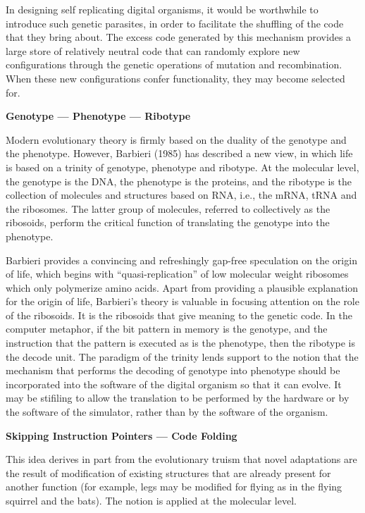 In designing self replicating digital organisms,
it would be worthwhile to introduce such genetic parasites, in order to
facilitate the shuffling of the code that they bring about.  The excess
code generated by this mechanism provides a large store of relatively
neutral code that can randomly explore new configurations through the
genetic operations of mutation and recombination.  When these new
configurations confer functionality, they may become selected for.

\LP
\bf Genotype --- Phenotype --- Ribotype\rm
\eLP

Modern evolutionary theory is firmly based on the duality of the genotype
and the phenotype.  However, Barbieri (1985) has described a new view, in
which life is based on a trinity of genotype, phenotype and ribotype.  At
the molecular level, the genotype is the DNA, the phenotype is the proteins,
and the ribotype is the collection of molecules and structures based on RNA,
i.e., the mRNA, tRNA and the ribosomes.  The latter group of molecules,
referred to collectively as the ribosoids, perform the critical function
of translating the genotype into the phenotype.

Barbieri provides a convincing and refreshingly gap-free speculation on the
origin of life, which begins with ``quasi-replication'' of low molecular
weight ribosomes which only polymerize amino acids.  Apart from providing
a plausible explanation for the origin of life, Barbieri's theory is
valuable in focusing attention on the role of the ribosoids.  It is the
ribosoids that give meaning to the genetic code.  In the computer metaphor,
if the bit pattern in memory is the genotype, and the instruction that the
pattern is executed as is the phenotype, then the ribotype is the decode
unit.  The paradigm of the trinity lends support to the notion that the
mechanism that performs the decoding of genotype into phenotype should be
incorporated into the software of the digital organism so that it can evolve.
It may be stifiling to allow the translation to be performed by the hardware
or by the software of the simulator, rather than by the software of the
organism.

\LP
\bf Skipping Instruction Pointers --- Code Folding\rm
\eLP

This idea derives in part from the evolutionary truism that novel adaptations
are the result of modification of existing structures that are already present
for another function (for example, legs may be modified for flying as in the
flying squirrel and the bats).  The notion is applied at the molecular level.

